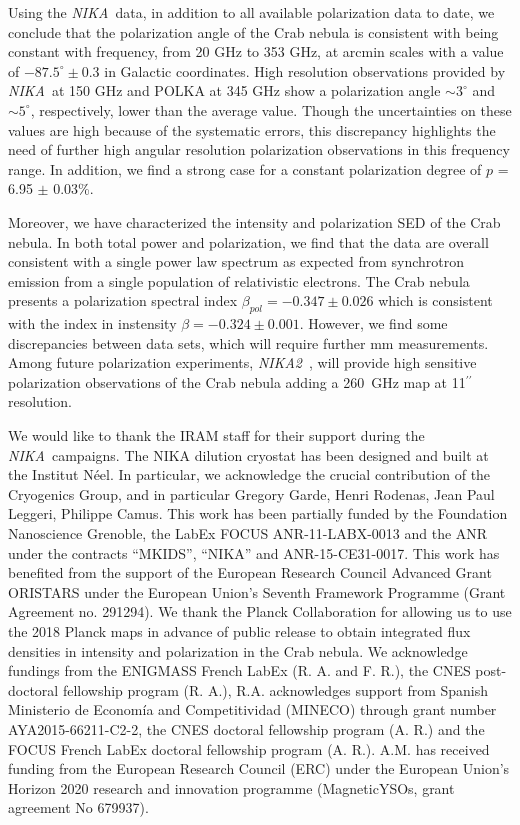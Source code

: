 \documentclass[twocolumn,traditabstract]{aa}
\def\NIKA{\textit{NIKA}}
\def\NIKAd{\textit{NIKA2}}
\begin{document}
Using the \NIKA\ data, in addition to all available polarization data to date, we conclude that the
polarization angle of the Crab nebula is consistent with being constant with
frequency, from 20 GHz to 353 GHz, at arcmin scales with a value of
$-87.5^{\circ}\pm0.3$ in Galactic coordinates. High resolution observations provided by \NIKA\ at 150 GHz and POLKA at 345 GHz show
a polarization angle $\sim 3^{\circ}$ and $\sim 5^{\circ}$, respectively, lower than the average value. Though the uncertainties on these values are high because of the systematic errors, this discrepancy highlights the need of further high angular resolution polarization observations in this frequency range.
In addition, we find a strong case for a constant polarization degree of $p$ = 6.95 $\pm$ 0.03\%. 

Moreover, we have characterized the intensity and polarization SED of the Crab nebula. In both total power and polarization, we find that the data are overall consistent with a single power law spectrum as expected from synchrotron emission from a single population of relativistic electrons.
The Crab nebula presents a polarization spectral index $\beta_{pol}=-0.347 \pm 0.026$ which is consistent with the index in instensity $\beta=-0.324 \pm 0.001$. 
However, we find some discrepancies between data sets, which will require further mm measurements. Among future polarization experiments, \NIKAd\ \citep{calvo2016}, will provide high sensitive polarization observations of the Crab nebula adding a 260~GHz map at 11$^{\prime\prime}$ resolution.



\vspace{0.2cm}
 \begin{acknowledgements}
We would like to thank the IRAM staff for their support during the \NIKA\ campaigns. 
The NIKA dilution cryostat has been designed and built at the Institut N\'eel. 
In particular, we acknowledge the crucial contribution of the Cryogenics Group, and 
in particular Gregory Garde, Henri Rodenas, Jean Paul Leggeri, Philippe Camus. 
This work has been partially funded by the Foundation Nanoscience Grenoble, the LabEx FOCUS ANR-11-LABX-0013 and 
the ANR under the contracts ``MKIDS'', ``NIKA'' and ANR-15-CE31-0017. 
This work has benefited from the support of the European Research Council Advanced Grant ORISTARS 
under the European Union's Seventh Framework Programme (Grant Agreement no. 291294).
We thank the Planck Collaboration for allowing us to use the 2018 Planck maps in advance of public release to obtain integrated flux densities in intensity and polarization in the Crab nebula. We acknowledge fundings from the ENIGMASS French LabEx (R. A. and F. R.), 
the CNES post-doctoral fellowship program (R. A.), R.A. acknowledges support from Spanish Ministerio de Econom\'ia and Competitividad (MINECO) through grant number AYA2015-66211-C2-2, the CNES doctoral fellowship program (A. R.) and
the FOCUS French LabEx doctoral fellowship program (A. R.).
A.M. has received funding from the European Research Council (ERC) under the European Union’s Horizon 2020 research and innovation programme (MagneticYSOs, grant agreement No 679937).
\end{acknowledgements}
\end{document}
